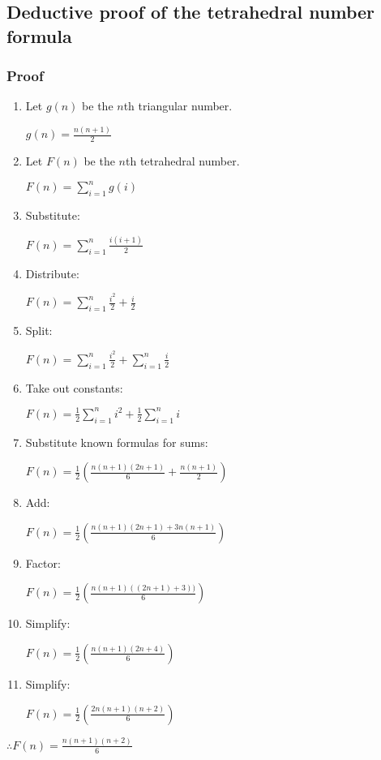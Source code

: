 \subsection*{Deductive proof of the tetrahedral number formula}
\subsubsection*{Proof}



\begin{enumerate}
	\item Let $g(n)$ be the $n$th triangular number.

		$g(n) = \frac{n(n+1)}{2}$
	\item Let $F(n)$ be the $n$th tetrahedral number.
	
		$F(n) = \sum\limits_{i=1}^n g(i)$
	\item Substitute:
		
		$F(n) = \sum\limits_{i=1}^n \frac{i(i+1)}{2}$
	\item Distribute:
	
		$F(n) = \sum\limits_{i=1}^n \frac{i^2}{2} + \frac{i}{2}$
	\item Split:
	
		$F(n) = \sum\limits_{i=1}^n \frac{i^2}{2} + \sum\limits_{i=1}^n \frac{i}{2}$
	\item Take out constants:
	
		$F(n) = \frac{1}{2} \sum\limits_{i=1}^n i^2 + \frac{1}{2} \sum\limits_{i=1}^n i$
	\item Substitute known formulas for sums:
	
		$F(n) = \frac{1}{2} \left( \frac{n(n+1)(2n+1)}{6} + \frac{n(n+1)}{2} \right) $
	\item Add:
	
		$F(n) = \frac{1}{2} \left( \frac{n(n+1)(2n+1) + 3n(n+1)}{6} \right) $
	\item Factor:
	
		$F(n) = \frac{1}{2} \left( \frac{n(n+1) ((2n+1) + 3))}{6} \right) $
	\item Simplify:
	
		$F(n) = \frac{1}{2} \left( \frac{n(n+1) (2n+4 )}{6} \right) $
	\item Simplify:
	
		$F(n) = \frac{1}{2} \left( \frac{2n(n+1) (n+2 )}{6} \right) $

\end{enumerate}

\begin{center}$\therefore F(n) = \frac{n(n+1)(n+2)}{6}$ \end{center}
